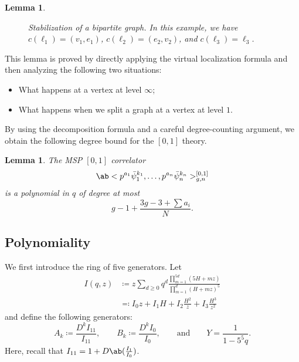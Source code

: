 \documentclass[10pt]{amsart}
\newtheorem{lem}[thm]{Lemma}
\theoremstyle{definition}
\theoremstyle{remark}
\theoremstyle{plain}
\theoremstyle{definition}
\theoremstyle{remark}
\newcommand{\1}{\mathbf{1}}
\newcommand{\2}{\mathbf{2}}
\newcommand{\3}{\mathbf{3}}
\begin{document}
\begin{lem}
\begin{figure}[htpb]
\begin{center}
    \end{center}
    \caption{Stabilization of a bipartite graph. In this example, we have $c(\ell_1) = (v_1, e_1)$, $c(\ell_2) = (e_2, v_2)$, and $c(\ell_3) = \ell_3$.}%
    \label{fig:stab}
    \end{figure}
\end{lem}

This lemma is proved by directly applying the virtual localization formula and then analyzing the following two situations:
\begin{itemize}
    \item What happens at a vertex at level $\infty$;
    \item What happens when we split a graph at a vertex at level $1$.
\end{itemize}

By using the decomposition formula and a careful degree-counting argument, we obtain the following degree bound for the $[0,1]$ theory.
\begin{lem}
    The MSP $[0,1]$ correlator
    \[ \ab<p^{a_1} \bar{\psi}_1^{k_1}, \dots, p^{a_n} \bar{\psi}_n^{k_n}>_{g,n}^{[0,1]} \]
    is a polynomial in $q$ of degree at most 
    \[ g-1 + \frac{3g-3 + \sum a_i}{N}. \]
\end{lem}

\subsection{Polynomiality}%
\label{sub:Polynomiality}

We first introduce the ring of five generators. Let
\begin{align*}
    I(q,z) &\coloneqq z \sum_{d \geq 0} q^d \frac{\prod_{m=1}^{5d}(5H+mz)}{\prod_{m=1}^d (H+mz)^5} \\
    &\eqqcolon I_0 z + I_1 H + I_2 \frac{H^2}{z} + I_3 \frac{H^3}{z^2}
\end{align*}
and define the following generators:
\[ A_k \coloneqq \frac{D^k I_{11}}{I_{11}}, \qquad B_k \coloneqq \frac{D^k I_0}{I_0}, \qquad \text{and} \qquad Y = \frac{1}{1-5^5q}. \]
Here, recall that $I_{11} = 1 + D\ab(\frac{I_1}{I_0})$.
\end{document}
